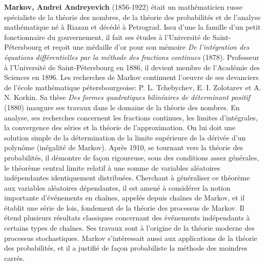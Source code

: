 \textbf{Markov, Andrei Andreyevich} (1856-1922) était un mathématicien russe spécialiste de la théorie des nombres, de la théorie des probabilités et de l'analyse mathématique né à Riazan et décédé à Petrograd. Issu d'une la famille d'un petit fonctionnaire du gouvernement, il fait ses études à l'Université de Saint-Pétersbourg et reçoit une médaille d'or pour son mémoire \textit{De l'intégration des équations différentielles par la méthode des fractions continues} (1878). Professeur à l'Université de Saint-Pétersbourg en 1886, il devient membre de l'Académie des Sciences en 1896. Les recherches de Markov continuent l'oeuvre de ses devanciers de l'école mathématique pétersbourgeoise: P. L. Tchebychev, E. I. Zolotarev et A. N. Korkin. Sa thèse \textit{Des formes quadratiques bilinéaires de déterminant positif} (1880) inaugure ses travaux dans le domaine de la théorie des nombres. En analyse, ses recherches concernent les fractions continues, les limites d'intégrales, la convergence des séries et la théorie de l'approximation. On lui doit une solution simple de la détermination de la limite supérieure de la dérivée d'un polynôme (inégalité de Markov). Après 1910, se tournant vers la théorie des probabilités, il démontre de façon rigoureuse, sous des conditions assez générales, le théorème central limite relatif à une somme de variables aléatoires indépendantes identiquement distribuées. Cherchant à généraliser ce théorème aux variables aléatoires dépendantes, il est amené à considérer la notion importante d'événements en chaînes, appelés depuis chaînes de Markov, et il établit une série de lois, fondement de la théorie des processus de Markov. Il étend plusieurs résultats classiques concernant des événements indépendants à certains types de chaînes. Ses travaux sont à l'origine de la théorie moderne des processus stochastiques. Markov s'intéressait aussi aux applications de la théorie des probabilités, et il a justifié de façon probabiliste la méthode des moindres carrés.

